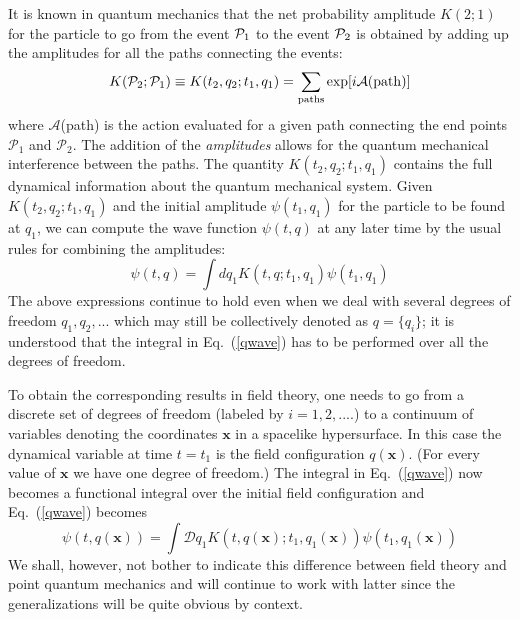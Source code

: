 \documentclass[12pt]{iopart}
\def\eq#1{{Eq.~(\ref{#1})}}
\begin{document}
  It is known in quantum mechanics that the 
net probability amplitude $K(2;1)$ for the particle to 
go from the event ${\cal P}_1$ to the event ${\cal P}_2$ is obtained by adding
up the amplitudes for all the paths connecting the events:
\begin{equation} 
K(\mathcal{P}_2;\mathcal{P}_1)\equiv K(t_2,q_2;t_1,q_1)=\sum_{{\rm paths}} \exp[i {\cal A}({\rm path})] 
\label{kerdef} 
\end{equation}
where $\mathcal{A}$(path) is the action evaluated for a given path connecting the end points
$\mathcal{P}_1$ and $\mathcal{P}_2$.
The addition of the {\it amplitudes} allows for the quantum mechanical interference
between the paths.  
The quantity $K(t_2,q_2;t_1,q_1)$ contains the full dynamical information about the quantum mechanical system.
Given $K(t_2,q_2;t_1,q_1)$ and the initial amplitude $\psi(t_1,q_1)$ for the particle to be 
found at $q_1$, we can compute the wave function $\psi(t,q)$ at any later time
by the usual rules for combining the amplitudes:
\begin{equation} \psi(t,q)=\int dq_1 K(t,q;t_1,q_1) \psi(t_1,q_1) 
\label{qwave}
\end{equation}
The above expressions continue to hold even when we deal with several degrees of freedom
$q_1, q_2, ...$ which may still be collectively denoted as $q=\{q_i\}$; it is understood that  the integral  in \eq{qwave} has to be performed over all the degrees of freedom.


To obtain the corresponding results in field theory, one needs to go from a discrete set of degrees of freedom (labeled by $i = 1,2,....$) to a continuum of variables denoting the coordinates $\mathbf{x}$ in a spacelike hypersurface. In this case the dynamical variable at time $t=t_1$ is the field configuration $q(\mathbf{x})$. (For every value of $\mathbf{x}$ we have one degree of freedom.) The integral in \eq{qwave} now becomes a functional integral over the initial field configuration and \eq{qwave} becomes 
\begin{equation} \psi(t,q(\mathbf{x}))=\int \mathcal{D}q_1 K(t,q(\mathbf{x});t_1,q_1(\mathbf{x})) \psi(t_1,q_1(\mathbf{x})) 
\label{qwave1}
\end{equation}
We shall, however, not bother to indicate this difference between field theory and point quantum mechanics and will continue to work with latter since the generalizations will be quite obvious by context. 
\end{document}
